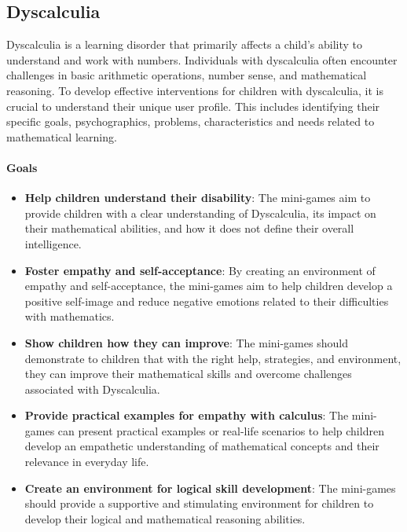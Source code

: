 \subsection{Dyscalculia}

Dyscalculia is a learning disorder that primarily affects a child's ability to understand and work with numbers. Individuals with dyscalculia often encounter challenges in basic arithmetic operations, number sense, and mathematical reasoning. To develop effective interventions for children with dyscalculia, it is crucial to understand their unique user profile. This includes identifying their specific goals, psychographics, problems, characteristics and needs related to mathematical learning.

\paragraph{Goals}
\begin{itemize}
    \item \textbf{Help children understand their disability}: The mini-games aim to provide children with a clear understanding of Dyscalculia, its impact on their mathematical abilities, and how it does not define their overall intelligence.
    \item \textbf{Foster empathy and self-acceptance}: By creating an environment of empathy and self-acceptance, the mini-games aim to help children develop a positive self-image and reduce negative emotions related to their difficulties with mathematics.
    \item \textbf{Show children how they can improve}: The mini-games should demonstrate to children that with the right help, strategies, and environment, they can improve their mathematical skills and overcome challenges associated with Dyscalculia.
    \item \textbf{Provide practical examples for empathy with calculus}: The mini-games can present practical examples or real-life scenarios to help children develop an empathetic understanding of mathematical concepts and their relevance in everyday life.
    \item \textbf{Create an environment for logical skill development}: The mini-games should provide a supportive and stimulating environment for children to develop their logical and mathematical reasoning abilities.
\end{itemize}

